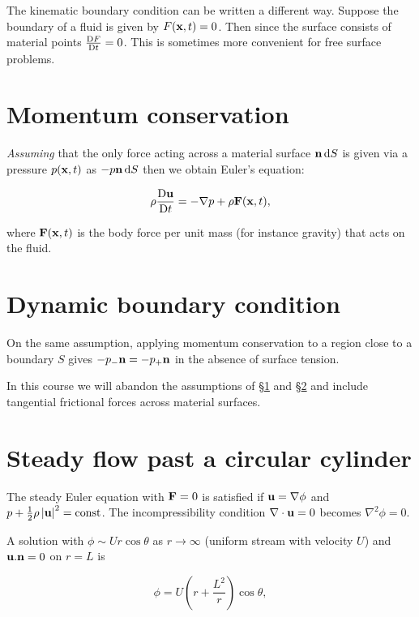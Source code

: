 \documentclass{notes}
\theoremstyle{plain}
\begin{document}
The kinematic boundary condition can be written a different way.  Suppose
the boundary of a fluid is given by $F(\mathbf{x},t) = 0$.  Then since the
surface consists of material points $\frac{\mathrm{D} F}{\mathrm{D} t} = 0$.   This is
sometimes more convenient for free surface problems.

\section{Momentum conservation}\label{sec:momc}

\emph{Assuming} that the only force acting across a material surface
$\mathbf{n}\, \mathrm{d} S$ is given via a pressure $p(\mathbf{x},t)$ as $-p \mathbf{n}\, \mathrm{d} S$ then we
obtain Euler's equation:

\begin{equation}\label{eq:euler}
\rho \frac{\mathrm{D}\mathbf{u}}{\mathrm{D} t} = - \nabla p + \rho \mathbf{F}(\mathbf{x},t),
\end{equation}

where $\mathbf{F}(\mathbf{x},t)$ is the body force per unit mass (for instance
gravity) that acts on the fluid.

\section{Dynamic boundary condition}\label{sec:dynbc}

On the same assumption, applying momentum conservation to a region close to
a boundary $S$ gives $-p_- \mathbf{n} = - p_+ \mathbf{n}$ in the absence of surface
tension.

In this course we will abandon the assumptions of \S\ref{sec:momc}
and \S\ref{sec:dynbc} and include tangential
frictional forces across material surfaces.

\section{Steady flow past a circular cylinder}

The steady Euler equation with $\mathbf{F} = 0$ is satisfied if
$\mathbf{u} = \nabla \phi$ and $p + \tfrac{1}{2} \rho \left|\mathbf{u}\right|^2 = \text{const}$.
The incompressibility condition $\nabla \cdot \mathbf{u} = 0$ becomes
$\nabla^2 \phi = 0$.

A solution with $\phi \sim U r \cos \theta$ as $r \to \infty$ (uniform
stream with velocity $U$) and $\mathbf{u} . \mathbf{n} = 0$ on $r = L$ is

\begin{equation}\label{eq:circcylpot}
\phi = U \left( r + \frac{L^2}{r} \right) \cos \theta,
\end{equation}
\end{document}
